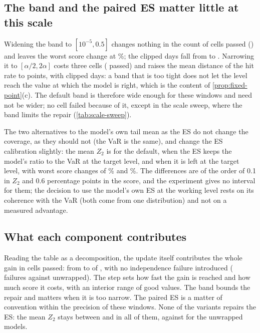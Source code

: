 \subsection{The band and the paired ES matter little at this scale}
\label{sec:ablation-band-es}

Widening the band to $[10^{-5}, 0.5]$ changes nothing in the count of cells passed (\ablBandWidePass{}) and leaves the worst score change at \ablBandWideFzWorst\%; the clipped days fall from \ablFullClip{} to \ablBandWideClip{}. Narrowing it to $[\alpha/2, 2\alpha]$ costs three cells (\ablBandNarrowPass{} passed) and raises the mean distance of the hit rate to \ablBandNarrowDev{} points, with \ablBandNarrowClip{} clipped days: a band that is too tight does not let the level reach the value at which the model is right, which is the content of \cref{prop:fixed-point}(c). The default band is therefore wide enough for these windows and need not be wider; no cell failed because of it, except in the scale sweep, where the band limits the repair (\cref{tab:scale-sweep}).

The two alternatives to the model's own tail mean as the ES do not change the coverage, as they should not (the VaR is the same), and change the ES calibration slightly: the mean $Z_2$ is \ablFullZtwo{} for the default, \ablEsRatioZtwo{} when the ES keeps the model's ratio to the VaR at the target level, and \ablEsTargetZtwo{} when it is left at the target level, with worst score changes of \ablEsRatioFzWorst\% and \ablEsTargetFzWorst\%. The differences are of the order of 0.1 in $Z_2$ and 0.6 percentage points in the score, and the experiment gives no interval for them; the decision to use the model's own ES at the working level rests on its coherence with the VaR (both come from one distribution) and not on a measured advantage.

\subsection{What each component contributes}
\label{sec:ablation-summary}

Reading the table as a decomposition, the update itself contributes the whole gain in cells passed: from \ablOffPass{} to \ablFullPass{} of \ablOffN{}, with no independence failure introduced (\ablFullInd{} failures against \ablOffInd{} unwrapped). The step sets how fast the gain is reached and how much score it costs, with an interior range of good values. The band bounds the repair and matters when it is too narrow. The paired ES is a matter of convention within the precision of these windows. None of the variants repairs the ES: the mean $Z_2$ stays between \ablEsRatioZtwo{} and \ablGammaAZtwo{} in all of them, against \ablOffZtwo{} for the unwrapped models.

